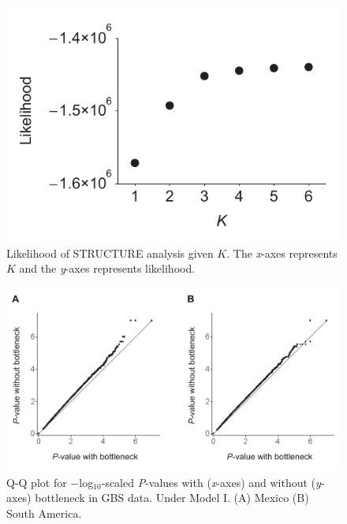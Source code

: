 \documentclass[onecolumn,oneside,letterpaper]{article}
\begin{document}
\begin{figure}[t]
  \begin{center}
    \includegraphics[width=0.4\columnwidth]{fig/kk.pdf}
    \caption{Likelihood of STRUCTURE analysis given $K$.  The \emph{x}-axes represents $K$ and the \emph{y}-axes represents likelihood.}
    \label{colfreq}
  \end{center}
\end{figure}



\begin{figure}[t]
  \begin{center}
    \includegraphics[width=0.6\columnwidth]{fig/bot.pdf}
    \caption{Q-Q plot for $-$log$_{10}$-scaled \emph{P}-values with (\emph{x}-axes) and without (\emph{y}-axes) bottleneck in GBS data.  Under Model I. (A) Mexico (B) South America.}
    \label{colfreq}
  \end{center}
\end{figure}
\end{document}
